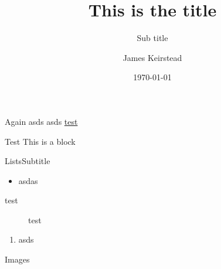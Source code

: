 
\title{This is the title}
\subtitle{Sub title}
\date{\today}
\author{James Keirstead}

\usepackage{lipsum}



\begin{frame}
\maketitle
\end{frame}

\lipsum[1]

\begin{frame}{Again}
asds \pause
asds \url{test}

\begin{block}{Test}
This is a block
\end{block}
\end{frame}

\lipsum[2]
\begin{frame}{Lists}{Subtitle}
\begin{itemize}
\item asdas
\end{itemize}

\begin{description}
\item [test] test
\end{description}

\begin{enumerate}
\item asds
\end{enumerate}
\end{frame}


\lipsum[3]

\begin{frame}{Images}


\end{frame}

\lipsum[4]


